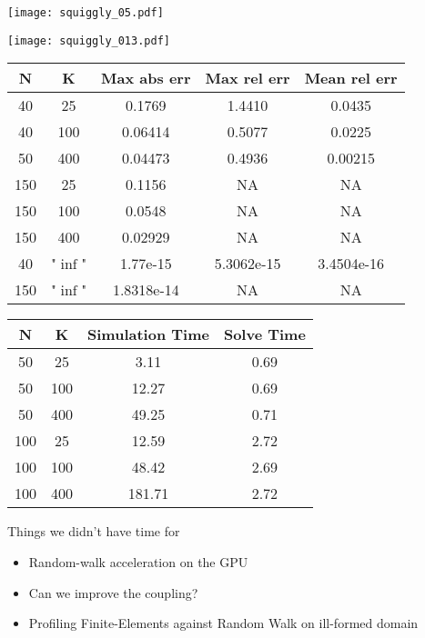 \documentclass{beamer}
\begin{document}

\begin{frame}
	\begin{centering}
	\texttt{[image: squiggly\_05.pdf]}
	\end{centering}
\end{frame}
\begin{frame}
	\begin{centering}
	\texttt{[image: squiggly\_013.pdf]}
	\end{centering}
\end{frame}

\begin{frame}
\begin{center}
	\begin{tabular}{|c|c|c|c|c|}
		\hline
		N & K & Max abs err & Max rel err & Mean rel err \\  
		\hline 
		40 & 25 & 0.1769 & 1.4410 & 0.0435 \\
		40 & 100 & 0.06414 & 0.5077 & 0.0225 \\
		50 & 400 & 0.04473 & 0.4936 & 0.00215 \\
		150 & 25 & 0.1156 & NA & NA \\
		150 & 100 & 0.0548 & NA & NA \\
		150 & 400 & 0.02929 & NA & NA \\
		40 & "$\inf$" & 1.77e-15 & 5.3062e-15 & 3.4504e-16 \\ 
		150 & "$\inf$" & 1.8318e-14 & NA & NA \\
		\hline
	\end{tabular}
	\end{center}
\end{frame}


\begin{frame}
	\begin{centering}
		\begin{tabular}{|c|c|c|c|}
			\hline
			N&K&Simulation Time&Solve Time\\
			\hline
			50&25&3.11&0.69\\
			50&100&12.27&0.69\\
			50&400&49.25&0.71\\
			100&25&12.59&2.72\\
			100&100&48.42&2.69\\
			100&400&181.71&2.72\\
			\hline
			\end{tabular}
	\end{centering}
	
\end{frame}

\begin{frame}{Things we didn't have time for}
	\begin{itemize}
		\item Random-walk acceleration on the GPU
		\item Can we improve the coupling?
		\item Profiling Finite-Elements against Random Walk on ill-formed domain
	\end{itemize}
\end{frame}

\end{document}
